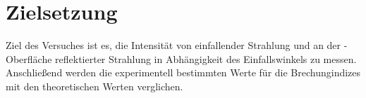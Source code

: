 \section{Zielsetzung}
\label{sec:zielsetzung}

Ziel des Versuches ist es, die Intensität von einfallender Strahlung und an der -Oberfläche reflektierter Strahlung 
in Abhängigkeit des Einfallswinkels zu messen. Anschließend werden die experimentell bestimmten Werte für die Brechungindizes
mit den theoretischen Werten verglichen.
